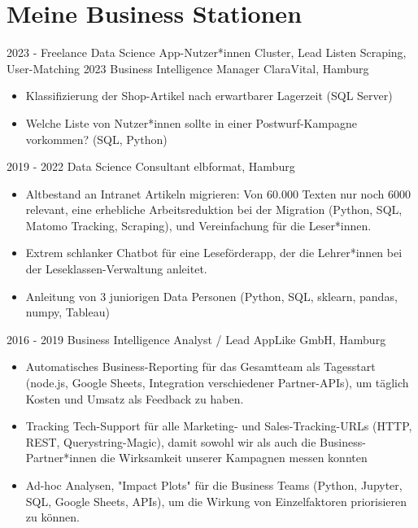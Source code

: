 \documentclass[a4paper]{twentysecondcv} %
\begin{document}
\section{Meine Business Stationen}

\begin{twenty}
  \twentyitem
    {2023 - }
    {Freelance Data Science}
    {}
    {App-Nutzer*innen Cluster, Lead Listen Scraping, User-Matching}
  \twentyitem
    {2023}
    {Business Intelligence Manager}
    {ClaraVital, Hamburg}
    {\begin{itemize}
    \item Klassifizierung der Shop-Artikel nach erwartbarer Lagerzeit (SQL Server)
    \item Welche Liste von Nutzer*innen sollte in einer Postwurf-Kampagne vorkommen? (SQL, Python)
    \end{itemize}}
  \twentyitem
    {2019 - 2022}
    {Data Science Consultant}
    {elbformat, Hamburg}
    {\begin{itemize}
    \item Altbestand an Intranet Artikeln migrieren: Von 60.000 Texten nur noch 6000 relevant, 
          eine erhebliche Arbeitsreduktion bei der Migration (Python, SQL, Matomo Tracking, Scraping), 
          und Vereinfachung f\"ur die Leser*innen.
    \item Extrem schlanker Chatbot f\"ur eine Lesef\"orderapp, der die Lehrer*innen bei der Leseklassen-Verwaltung anleitet.
    \item Anleitung von 3 juniorigen Data Personen (Python, 
          SQL, sklearn, pandas, numpy, Tableau)
    \end{itemize}}
  \twentyitem
    {2016 - 2019}
    {Business Intelligence Analyst / Lead}
    {AppLike GmbH, Hamburg}
    {\begin{itemize}
    \item Automatisches Business-Reporting f\"ur das Gesamtteam als Tagesstart (node.js, Google Sheets, Integration verschiedener Partner-APIs), um t\"aglich Kosten und Umsatz als Feedback zu haben.
    \item Tracking Tech-Support f\"ur alle Marketing- und Sales-Tracking-URLs (HTTP, REST, Querystring-Magic), damit sowohl wir als auch die Business-Partner*innen die Wirksamkeit unserer Kampagnen messen konnten
    \item Ad-hoc Analysen, "Impact Plots" f\"ur die Business Teams (Python, Jupyter, SQL, Google Sheets, APIs), um die Wirkung von Einzelfaktoren priorisieren zu k\"onnen.

\end{itemize}}
\end{twenty}
\end{document}

